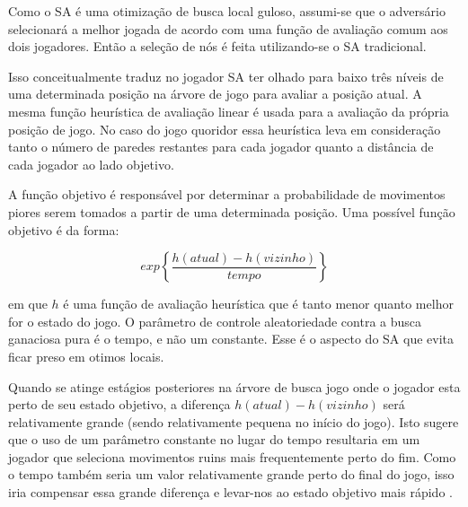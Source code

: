 Como o SA é uma otimização de busca local guloso, assumi-se que o adversário
selecionará a melhor jogada de acordo com uma função de avaliação comum aos dois
jogadores. Então a seleção de nós é feita utilizando-se o SA tradicional.

Isso conceitualmente traduz no jogador SA ter olhado para baixo três níveis de
uma determinada posição na árvore de jogo para avaliar a posição atual. A mesma
função heurística de avaliação linear é usada para a avaliação da própria
posição de jogo. No caso do jogo quoridor essa heurística leva em consideração
tanto o número de paredes restantes para cada jogador quanto a distância de cada
jogador ao lado objetivo.

A função objetivo é responsável por determinar a probabilidade de movimentos
piores serem tomados a partir de uma determinada posição. Uma possível função
objetivo é da forma:

\begin{equation}
  exp\left\{\frac{h(atual)- h(vizinho)}{tempo}\right\}
\end{equation}

em que $h$ é uma função de avaliação heurística que é tanto menor quanto melhor
for o estado do jogo. O parâmetro de controle aleatoriedade contra a busca
ganaciosa pura é o tempo, e não um constante. Esse é o aspecto do SA que evita
ficar preso em otimos locais.

Quando se atinge estágios posteriores na árvore de busca jogo onde o jogador
esta perto de seu estado objetivo, a diferença $h(atual)- h(vizinho)$
será relativamente grande (sendo relativamente pequena no início do jogo). Isto
sugere que o uso de um parâmetro constante no lugar do tempo resultaria em um
jogador que seleciona movimentos ruins mais frequentemente perto do fim.
Como o tempo também seria um valor relativamente grande perto do final do jogo,
isso iria compensar essa grande diferença e levar-nos ao estado objetivo mais
rápido \cite{mcdermid2003gaquoridor}.

